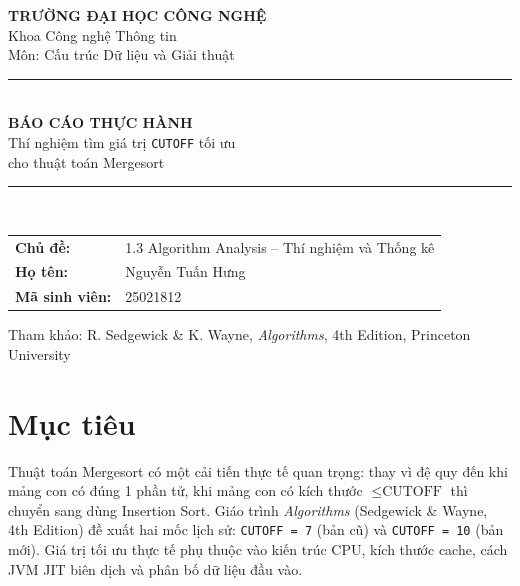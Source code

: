 \documentclass[12pt, a4paper]{article}
\begin{document}
\begin{titlepage}
\centering
\vspace*{1.5cm}

{\Large\bfseries TRƯỜNG ĐẠI HỌC CÔNG NGHỆ}\\[0.4cm]
{\large Khoa Công nghệ Thông tin}\\[0.3cm]
{\large Môn: Cấu trúc Dữ liệu và Giải thuật}\\[2cm]

\rule{0.8\textwidth}{1.5pt}\\[0.5cm]
{\LARGE\bfseries BÁO CÁO THỰC HÀNH}\\[0.4cm]
{\Large Thí nghiệm tìm giá trị \texttt{CUTOFF} tối ưu\\cho thuật toán Mergesort}\\[0.5cm]
\rule{0.8\textwidth}{1.5pt}\\[2cm]

\begin{tabular}{ll}
    \textbf{Chủ đề:}            & 1.3 Algorithm Analysis – Thí nghiệm và Thống kê \\[6pt]
    \textbf{Họ tên:}            & Nguyễn Tuấn Hưng \\[6pt]
    \textbf{Mã sinh viên:}   & 25021812 \\[6pt]
\end{tabular}

\vfill
{\small Tham khảo: R. Sedgewick \& K. Wayne, \textit{Algorithms}, 4th Edition, Princeton University}
\end{titlepage}

\tableofcontents
\newpage

\section{Mục tiêu}

Thuật toán Mergesort có một cải tiến thực tế quan trọng: thay vì đệ quy đến khi
mảng con có đúng 1 phần tử, khi mảng con có kích thước $\leq \text{CUTOFF}$ thì
chuyển sang dùng Insertion Sort. Giáo trình \textit{Algorithms} (Sedgewick \& Wayne,
4th Edition) đề xuất hai mốc lịch sử: \texttt{CUTOFF = 7} (bản cũ) và
\texttt{CUTOFF = 10} (bản mới). Giá trị tối ưu thực tế phụ thuộc vào kiến trúc CPU,
kích thước cache, cách JVM JIT biên dịch và phân bố dữ liệu đầu vào.
\end{document}
